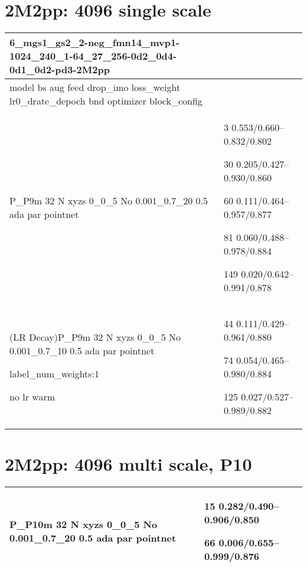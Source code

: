\documentclass[,table,dvipsnames]{article}
\begin{document}
\section{2M2pp: 4096 single scale}
\noindent\begin{tabular}{|p{10cm}|p{5.5cm}| }	
\hline
6\_mgs1\_gs2\_2-neg\_fmn14\_mvp1-1024\_240\_1-64\_27\_256-0d2\_0d4-0d1\_0d2-pd3-2M2pp & \\
\hline
model bs aug feed drop\_imo loss\_weight lr0\_drate\_depoch bnd optimizer block\_config&\\

\rowcolor{green!20}
P\_P9m 32 N xyzs 0\_0\_5 No 0.001\_0.7\_20 0.5 ada par pointnet& 3 0.553/0.660--0.832/0.802\par 30 0.205/0.427--0.930/0.860\par 60 0.111/0.464--0.957/0.877\par 81 0.060/0.488--0.978/0.884\par 149 0.020/0.642--0.991/0.878\\

\rowcolor{red!20}
(LR Decay)P\_P9m 32 N xyzs 0\_0\_5 No 0.001\_0.7\_10 0.5 ada par pointnet \par label\_num\_weights:1 \par no lr warm& 44 0.111/0.429--0.961/0.880 \par 74 0.054/0.465--0.980/0.884\par 125 0.027/0.527--0.989/0.882\\
\hline 	
\end{tabular}

\section{2M2pp: 4096 multi scale, P10}
\noindent\begin{tabular}{|p{10cm}|p{5.5cm}| }	
\hline
\rowcolor{green!20}
P\_P10m 32 N xyzs 0\_0\_5 No 0.001\_0.7\_20 0.5 ada par pointnet& 15 0.282/0.490--0.906/0.850\par 66 0.006/0.655--0.999/0.876\\
\hline 	
\end{tabular}
\end{document}
